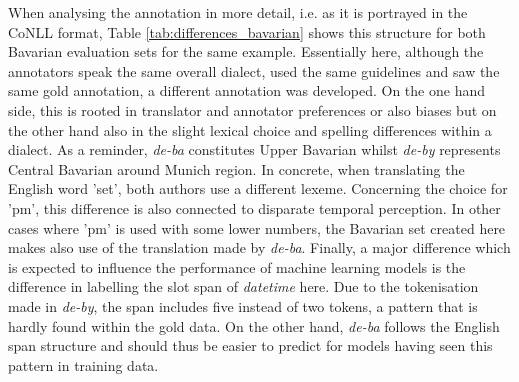 \documentclass[11pt,a4paper,twoside,openright]{scrbook}
\begin{document}
When analysing the annotation in more detail, i.e. as it is portrayed in the CoNLL format, Table \ref{tab:differences_bavarian} shows this structure for both Bavarian evaluation sets for the same example. Essentially here, although the annotators speak the same overall dialect, used the same guidelines and saw the same gold annotation, a different annotation was developed. On the one hand side, this is rooted in translator and annotator preferences or also biases but on the other hand also in the slight lexical choice and spelling differences within a dialect. As a reminder, \textit{de-ba} constitutes Upper Bavarian whilst \textit{de-by} represents Central Bavarian around Munich region. In concrete, when translating the English word 'set', both authors use a different lexeme. Concerning the choice for 'pm', this difference is also connected to disparate temporal perception. In other cases where 'pm' is used with some lower numbers, the Bavarian set created here makes also use of the translation made by \textit{de-ba}. Finally, a major difference which is expected to influence the performance of machine learning models is the difference in labelling the slot span of \textit{datetime} here. Due to the tokenisation made in \textit{de-by}, the span includes five instead of two tokens, a pattern that is hardly found within the gold data. On the other hand, \textit{de-ba} follows the English span structure and should thus be easier to predict for models having seen this pattern in training data.
\end{document}
